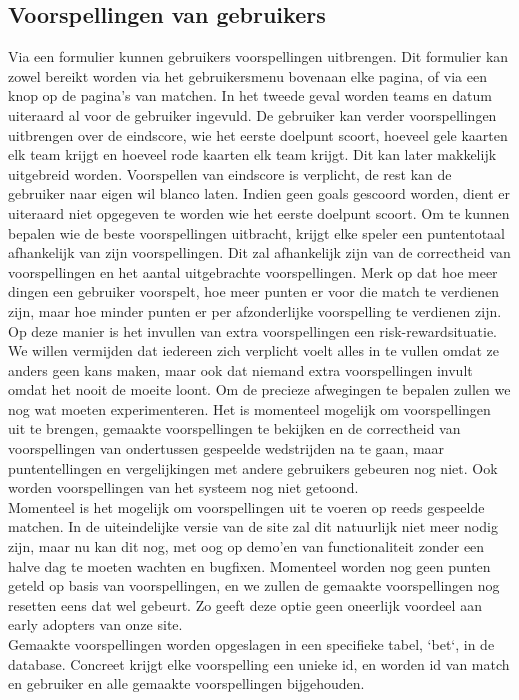 \documentclass[11pt, a4paper]{article}
\begin{document}
\subsection{Voorspellingen van gebruikers}
Via een formulier kunnen gebruikers voorspellingen uitbrengen. Dit formulier kan zowel bereikt worden via het gebruikersmenu bovenaan elke pagina, of via een knop op de pagina's van matchen. In het tweede geval worden teams en datum uiteraard al voor de gebruiker ingevuld. De gebruiker kan verder voorspellingen uitbrengen over de eindscore, wie het eerste doelpunt scoort, hoeveel gele kaarten elk team krijgt en hoeveel rode kaarten elk team krijgt. Dit kan later makkelijk uitgebreid worden. Voorspellen van eindscore is verplicht, de rest kan de gebruiker naar eigen wil blanco laten. Indien geen goals gescoord worden, dient er uiteraard niet opgegeven te worden wie het eerste doelpunt scoort.	Om te kunnen bepalen wie de beste voorspellingen uitbracht, krijgt elke speler een puntentotaal afhankelijk van zijn voorspellingen. Dit zal afhankelijk zijn van de correctheid van voorspellingen en het aantal uitgebrachte voorspellingen. Merk op dat hoe meer dingen een gebruiker voorspelt, hoe meer punten er voor die match te verdienen zijn, maar hoe minder punten er per afzonderlijke voorspelling te verdienen zijn. Op deze manier is het invullen van extra voorspellingen een risk-rewardsituatie. We willen vermijden dat iedereen zich verplicht voelt alles in te vullen omdat ze anders geen kans maken, maar ook dat niemand extra voorspellingen invult omdat het nooit de moeite loont. Om de precieze afwegingen te bepalen zullen we nog wat moeten experimenteren. Het is momenteel mogelijk om voorspellingen uit te brengen, gemaakte voorspellingen te bekijken en de correctheid van voorspellingen van ondertussen gespeelde wedstrijden na te gaan, maar puntentellingen en vergelijkingen met andere gebruikers gebeuren nog niet. Ook worden voorspellingen van het systeem nog niet getoond.
\\
Momenteel is het mogelijk om voorspellingen uit te voeren op reeds gespeelde matchen. In de uiteindelijke versie van de site zal dit natuurlijk niet meer nodig zijn, maar nu kan dit nog, met oog op demo'en van functionaliteit zonder een halve dag te moeten wachten en bugfixen. Momenteel worden nog geen punten geteld op basis van voorspellingen, en we zullen de gemaakte voorspellingen nog resetten eens dat wel gebeurt. Zo geeft deze optie geen oneerlijk voordeel aan early adopters van onze site.
\\
Gemaakte voorspellingen worden opgeslagen in een specifieke tabel, `bet`, in de database. Concreet krijgt elke voorspelling een unieke id, en worden id van match en gebruiker en alle gemaakte voorspellingen bijgehouden.
\end{document}
